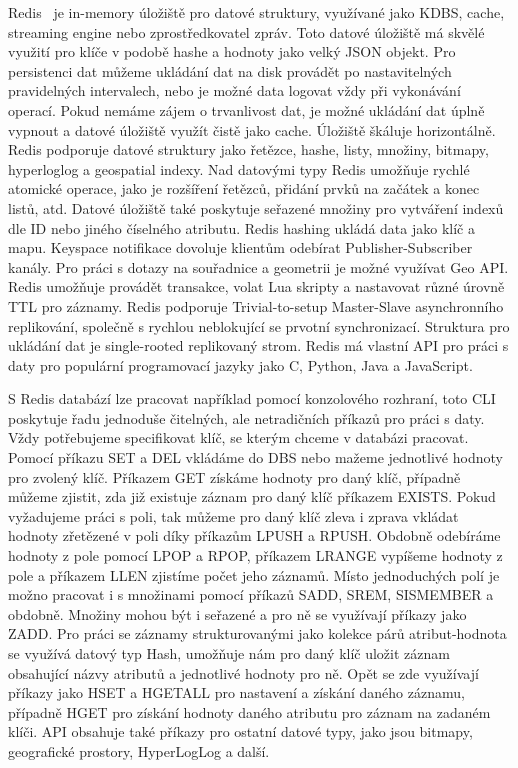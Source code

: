 \documentclass[czech,master,dept460,male,csharp,cpdeclaration]{diploma}
\begin{document}
	Redis~\cite{redis} je in-memory úložiště pro datové struktury, využívané jako KDBS, cache, streaming engine nebo zprostředkovatel zpráv. Toto datové úložiště má skvělé využití pro klíče v podobě hashe a hodnoty jako velký JSON objekt. Pro persistenci dat můžeme ukládání dat na disk provádět po nastavitelných pravidelných intervalech, nebo je možné data logovat vždy při vykonávání operací. Pokud nemáme zájem o trvanlivost dat, je možné ukládání dat úplně vypnout a datové úložiště využít čistě jako cache. Úložiště škáluje horizontálně. Redis podporuje datové struktury jako řetězce, hashe, listy, množiny, bitmapy, hyperloglog a geospatial indexy. Nad datovými typy Redis umožňuje rychlé atomické operace, jako je rozšíření řetězců, přidání prvků na začátek a konec listů, atd. Datové úložiště také poskytuje seřazené množiny pro vytváření indexů dle ID nebo jiného číselného atributu. Redis hashing ukládá data jako klíč a mapu. Keyspace notifikace dovoluje klientům odebírat Publisher-Subscriber kanály. Pro práci s dotazy na souřadnice a geometrii je možné využívat Geo API. Redis umožňuje provádět transakce, volat Lua skripty a nastavovat různé úrovně TTL pro záznamy. Redis podporuje Trivial-to-setup Master-Slave asynchronního replikování, společně s rychlou neblokující se prvotní synchronizací. Struktura pro ukládání dat je single-rooted replikovaný strom. Redis má vlastní API pro práci s daty pro populární programovací jazyky jako C, Python, Java a JavaScript.
	
	S Redis databází lze pracovat například pomocí konzolového rozhraní, toto CLI~\cite{rediscli} poskytuje řadu jednoduše čitelných, ale netradičních příkazů pro práci s daty. Vždy potřebujeme specifikovat klíč, se kterým chceme v databázi pracovat. Pomocí příkazu SET a DEL vkládáme do DBS nebo mažeme jednotlivé hodnoty pro zvolený klíč. Příkazem GET získáme hodnoty pro daný klíč, případně můžeme zjistit, zda již existuje záznam pro daný klíč příkazem EXISTS. Pokud vyžadujeme práci s poli, tak můžeme pro daný klíč zleva i zprava vkládat hodnoty zřetězené v poli díky příkazům LPUSH a RPUSH. Obdobně odebíráme hodnoty z pole pomocí LPOP a RPOP, příkazem LRANGE vypíšeme hodnoty z pole a příkazem LLEN zjistíme počet jeho záznamů. Místo jednoduchých polí je možno pracovat i s množinami pomocí příkazů SADD, SREM, SISMEMBER a obdobně. Množiny mohou být i seřazené a pro ně se využívají příkazy jako ZADD. Pro práci se záznamy strukturovanými jako kolekce párů atribut-hodnota se využívá datový typ Hash, umožňuje nám pro daný klíč uložit záznam obsahující názvy atributů a jednotlivé hodnoty pro ně. Opět se zde využívají příkazy jako HSET a HGETALL pro nastavení a získání daného záznamu, případně HGET pro získání hodnoty daného atributu pro záznam na zadaném klíči. API obsahuje také příkazy pro ostatní datové typy, jako jsou bitmapy, geografické prostory, HyperLogLog a další.
	
\end{document}
